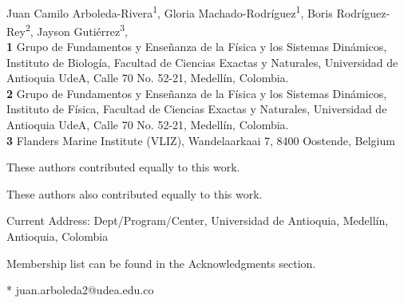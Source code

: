 \documentclass[10pt,letterpaper]{article}
\date{}
\begin{document}
\vspace*{0.2in}

\begin{flushleft}
{\Large
\textbf{}
}
\newline
\\
Juan Camilo Arboleda-Rivera\textsuperscript{1\Yinyang},
Gloria Machado-Rodríguez\textsuperscript{1\Yinyang},
Boris Rodríguez-Rey\textsuperscript{2\textcurrency},
Jayson Gutiérrez\textsuperscript{3},
\\
\bigskip
\textbf{1} Grupo de Fundamentos y Enseñanza de la Física y los Sistemas Dinámicos,
Instituto de Biología, Facultad de Ciencias Exactas y Naturales, Universidad de Antioquia
UdeA, Calle 70 No. 52-21, Medellín, Colombia.
\\
\textbf{2} Grupo de Fundamentos y Enseñanza de la Física y los Sistemas Dinámicos,
Instituto de Física, Facultad de Ciencias Exactas y Naturales, Universidad de Antioquia
UdeA, Calle 70 No. 52-21, Medellín, Colombia.
\\
\textbf{3} Flanders Marine Institute (VLIZ), Wandelaarkaai 7, 8400 Oostende,
Belgium
\\
\bigskip

% 
%
\Yinyang These authors contributed equally to this work.

\ddag These authors also contributed equally to this work.

\textcurrency Current Address: Dept/Program/Center, Universidad de Antioquia, 
Medellín, Antioquia, Colombia %


\textpilcrow Membership list can be found in the Acknowledgments section.

* juan.arboleda2@udea.edu.co

\end{flushleft}
\end{document}
